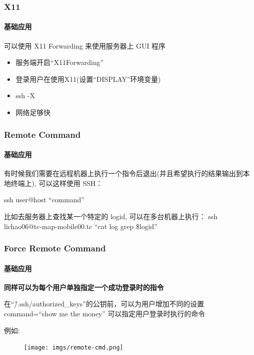 \begin{frame}[fragile]
  \frametitle{X11}
  \framesubtitle{基础应用}

  可以使用 X11 Forwarding 来使用服务器上 GUI 程序
  \begin{itemize}
  \item 服务端开启``X11Forwarding''
  \item 登录用户在使用X11(设置``DISPLAY''环境变量)
  \item ssh -X
  \item 网络足够快
  \end{itemize}
\end{frame}


\begin{frame}[fragile]
  \frametitle{Remote Command}
  \framesubtitle{基础应用}

  有时候我们需要在远程机器上执行一个指令后退出(并且希望执行的结果输出到本地终端上), 可以这样使用 SSH：

  \vspace{\baselineskip}
  ssh user@host ``command''
  \vspace{\baselineskip}

  \pause
  比如去服务器上查找某一个特定的 logid, 可以在多台机器上执行：
  \vspace{\baselineskip}
  ssh lichao06@tc-map-mobile00.tc ``cat log \textbar{} grep \$logid''

\end{frame}

\begin{frame}[fragile]
  \frametitle{Force Remote Command}
  \framesubtitle{基础应用}

  \textbf{同样可以为每个用户单独指定一个成功登录时的指令} \pause

  在``\~/.ssh/authorized\_keys''的公钥前，可以为用户增加不同的设置 \pause \\
  command=``show me the money'' 可以指定用户登录时执行的命令 \pause 
  \vspace{\baselineskip}

  例如:
  \begin{figure}[htbp]
    \centering
    \texttt{[image: imgs/remote-cmd.png]}
    \label{fig:ssh-remote-cmd}
  \end{figure}
\end{frame}


